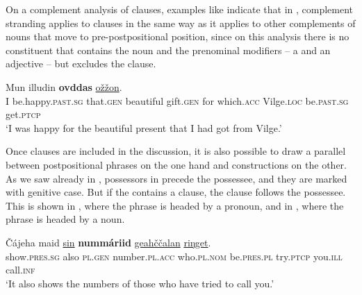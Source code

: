 \documentclass[output=paper]{LSP/langsci}
\begin{document}
On a complement analysis of  clauses, examples like  indicate that in , complement stranding applies to  clauses in the same way as it applies to other complements of nouns that move to pre-postpositional position, since on this analysis there is no constituent that contains the noun and the prenominal modifiers – a  and an adjective – but excludes the  clause. 


\ea%
    \label{ex:julien:38}
    \gll  Mun  illudin                      \textbf{ovddas}                   \uline{ožžon}.\\ 
    I    be.happy.\textsc{past.sg}  that.\textsc{gen}  beautiful  gift.\textsc{gen}    for   which.\textsc{acc} Vilge.\textsc{loc}  be.\textsc{past.sg}  get.\textsc{ptcp}	\\
    \glt   ‘I was happy for the beautiful present that I had got from Vilge.’
    \z

Once  clauses are included in the discussion, it is also possible to draw a parallel between postpositional phrases on the one hand and  constructions on the other. As we saw already in , possessors in  precede the possessee, and they are marked with genitive case. But if the  contains a  clause, the  clause follows the possessee. This is shown in , where the  phrase is headed by a pronoun, and in , where the  phrase is headed by a noun.


\ea%
    \label{ex:julien:39}
   
    \gll    Čájeha        maid  \uline{sin}      \textbf{nummáriid}               \uline{geahččalan}      \uline{riŋget}.\\ 
	 show.\textsc{pres.sg} also  \textsc{pl.gen}  number.\textsc{pl.acc}  who.\textsc{pl.nom}  be.\textsc{pres.pl}   try.\textsc{ptcp}      you.\textsc{ill}  call.\textsc{inf}\\
    \glt   ‘It also shows the numbers of those who have tried to call you.’
    \z

\ea%
    \label{ex:julien:40}
   
\end{document}
